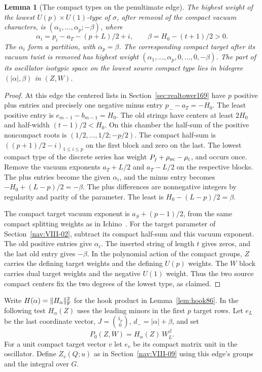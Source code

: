 \documentclass[a4paper,11pt]{article}
\newtheorem{lemma}[proposition]{Lemma}
\theoremstyle{definition}
\theoremstyle{remark}
\numberwithin{equation}{section}
\begin{document}
\begin{lemma}[The compact types on the penultimate edge]
\label{lem:types185}
The highest weight of the lowest \(U(p)\times U(1)\)-type
of \(\sigma\), after removal of the compact vacuum characters,
is \((\alpha_1,\ldots,\alpha_p;-\beta)\), where
\[
 \alpha_i=p_i-a_T-(p+L)/2+i,\qquad
 \beta=H_0-(t+1)/2>0 .
\]
The \(\alpha_i\) form a partition, with \(\alpha_p=\beta\).
The corresponding compact target after its vacuum twist is
removed has highest weight
\((\alpha_1,\ldots,\alpha_p,0,\ldots,0,-\beta)\).
The part of its oscillator isotypic space on the lowest
source compact type lies in bidegree \((|\alpha|,\beta)\)
in \((Z,W)\).
\end{lemma}
\begin{proof}
At this edge the centered lists in Section~\ref{sec:realtower169}
have \(p\) positive plus entries and precisely one negative
minus entry \(p_--a_T=-H_0\). The least positive entry is
\(e_{m-1}-b_{m-1}=H_0\). The old strings have centers at
least \(2H_0\) and half-width \((t-1)/2<H_0\). On this chamber
the half-sum of the positive noncompact roots is
\((1/2,\ldots,1/2;-p/2)\). The compact half-sum is
\(((p+1)/2-i)_{1\le i\le p}\) on the first block and zero
on the last. The lowest compact type of the discrete series
has weight \(P_j+\rho_{\rm nc}-\rho_{\rm c}\), and occurs
once. Remove the vacuum exponents \(a_T+L/2\) and \(a_T-L/2\)
on the respective blocks. The plus entries become the given
\(\alpha_i\), and the minus entry becomes
\(-H_0+(L-p)/2=-\beta\). The plus differences are
nonnegative integers by regularity and parity of the parameter.
The least is \(H_0-(L-p)/2=\beta\).

The compact target vacuum exponent is \(a_S+(p-1)/2\),
from the same compact splitting weights as in
Ichino~\cite[Lemma~7.8]{XX-XV-ichino328}.
For the target parameter of Section~\ref{nav:VIII-02}, subtract its compact
half-sum and this vacuum exponent. The old positive entries
give \(\alpha_i\). The inserted string of length \(t\) gives
zeros, and the last old entry gives \(-\beta\). In the
polynomial action of the compact groups, \(Z\) carries the
defining target weights and the defining \(U(p)\) weights.
The \(W\) block carries dual target weights and the negative
\(U(1)\) weight. Thus the two source compact centers fix
the two degrees of the lowest type, as claimed.
\end{proof}

Write \(H(\alpha)=\|H_\alpha\|_{\rm F}^2\) for the hook
product in Lemma~\ref{lem:hook86}. In the following test
\(H_\alpha(Z)\) uses the leading minors in the first \(p\)
target rows. Let \(e_L\) be the last coordinate vector,
\(J=\binom{1_p}0\), \(d_-=|\alpha|+\beta\), and set
\[
                     P_0(Z,W)=H_\alpha(Z)\,W_L^\beta .
\]
For a unit compact target vector \(v\) let \(e_v\) be its
compact matrix unit in the oscillator. Define \(Z_v(Q;u)\)
as in Section~\ref{nav:VIII-09} using this edge's groups and the integral
over \(G\).
\end{document}
